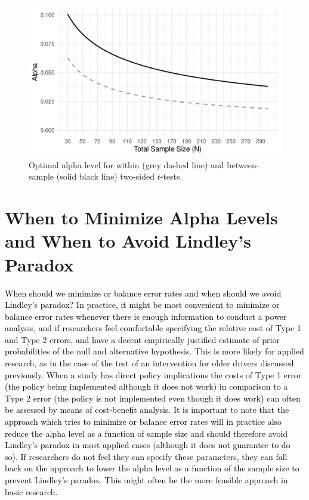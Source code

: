 \documentclass[
  english,
  ,man, a4paper,floatsintext]{apa6}
\begin{document}
\begin{figure}
\centering
\includegraphics{Justify_in_Practice_files/figure-latex/lindleyplot-1.pdf}
\caption{\label{fig:lindleyplot}Optimal alpha level for within (grey dashed line) and between-sample (solid black line) two-sided \(t\)-tests.}
\end{figure}

\hypertarget{when-to-minimize-alpha-levels-and-when-to-avoid-lindleys-paradox}{%
\section{When to Minimize Alpha Levels and When to Avoid Lindley's Paradox}\label{when-to-minimize-alpha-levels-and-when-to-avoid-lindleys-paradox}}

\textcolor{black}{When should we minimize or balance error rates and when should we avoid Lindley's paradox? In practice, it might be most convenient to minimize or balance error rates whenever there is enough information to conduct a power analysis, and if researchers feel comfortable specifying the relative cost of Type 1 and Type 2 errors, and have a decent empirically justified estimate of prior probabilities of the null and alternative hypothesis. This is more likely for applied research, as in the case of the test of an intervention for older drivers discussed previously. When a study has direct policy implications the costs of Type 1 error (the policy being implemented although it does not work) in comparison to a Type 2 error (the policy is not implemented even though it does work) can often be assessed by means of cost-benefit analysis. It is important to note that the approach which tries to minimize or balance error rates will in practice also reduce the alpha level as a function of sample size and should therefore avoid Lindley’s paradox in most applied cases (although it does not guarantee to do so). If researchers do not feel they can specify these parameters, they can fall back on the approach to lower the alpha level as a function of the sample size to prevent Lindley’s paradox. This might often be the more feasible approach in basic research.}
\end{document}
